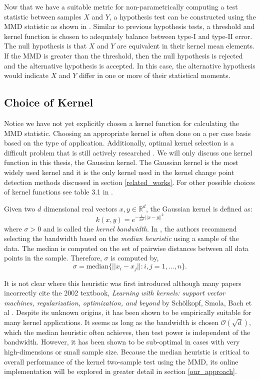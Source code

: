 Now that we have a suitable metric for non-parametrically computing a test statistic between samples $X$ and $Y$, a hypothesis test can be constructed using the MMD statistic as shown in \cite{gretton2012kernel}. Similar to previous hypothesis tests, a threshold and kernel function is chosen to adequately balance between type-I and type-II error. The null hypothesis is that $X$ and $Y$ are equivalent in their kernel mean elements.  If the MMD is greater than the threshold, then the null hypothesis is rejected and the alternative hypothesis is accepted. In this case, the alternative hypothesis would indicate $X$ and $Y$ differ in one  or more of their statistical moments.

\subsection{Choice of Kernel}
Notice we have not yet explicitly chosen a kernel function for calculating the MMD statistic. Choosing an appropriate kernel is often done on a per case basis based on the type of application. Additionally, optimal kernel selection is a difficult problem that is still actively researched \cite{fukumizu2009kernel} \cite{gretton2012optimal}. We will only discuss one kernel function in this thesis, the Gaussian kernel. The Gaussian kernel is the most widely used kernel and it is the only kernel used in the kernel change point detection methods discussed in section \ref{related_works}.  For other possible choices of kernel functions see table 3.1 in \cite{muandet2017kernel}.

Given two $d$ dimensional real vectors $x, y \in \mathbb{R}^d$, the Gaussian kernel is defined as:
\begin{equation}
k(x, y)= e^{-\frac{1}{2\sigma^2}||x-y||^2}
\end{equation}
where $\sigma > 0$ and is called the \textit{kernel bandwidth}. In \cite{gretton2005kernel}, the authors recommend selecting the bandwidth based on the \textit{median heuristic} using a sample of the data. The median is computed on the set of pairwise distances between all data points in the sample. Therefore, $\sigma$ is computed by, 
\begin{equation}
\sigma=\text{median}\{||x_i-x_j||:i,j = 1,...,n \}.
\end{equation}

It is not clear where this heuristic was first introduced although many papers incorrectly cite the 2002 textbook, \textit{Learning with kernels: support vector machines, regularization, optimization, and beyond} by Sch{\"o}lkopf, Smola, Bach et al \cite{garreau2017large}. Despite its unknown origins, it has been shown to be empirically suitable for many kernel applications. It seems as long as the bandwidth is chosen $\mathcal{O}(\sqrt{d})$, which the median heuristic often achieves, then test power is independent of the bandwidth. However, it has been shown to be sub-optimal in cases with very high-dimensions \cite{muandet2014kernel} or small sample size\cite{ramdas2015decreasing}. Because the median heuristic is critical to overall performance of the kernel two-sample test using the MMD, its online implementation will be explored in greater detail in section \ref{our_approach}.
 

